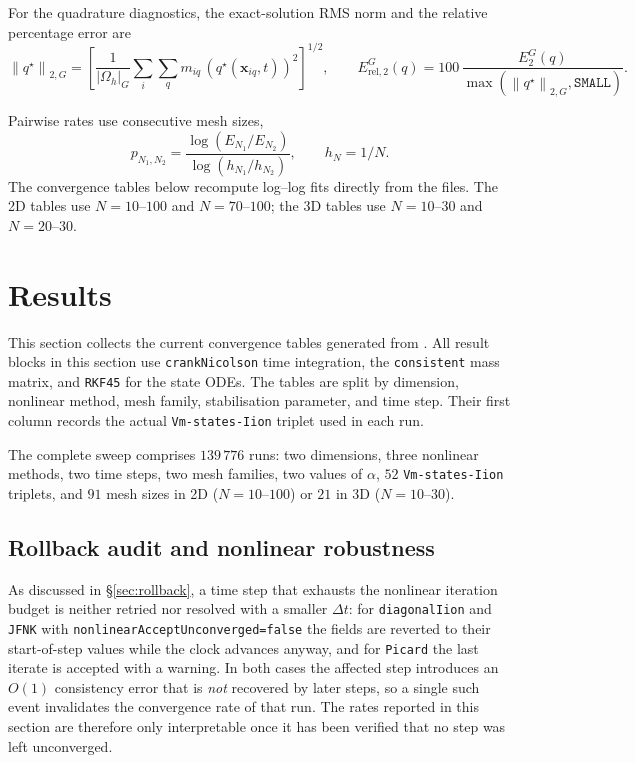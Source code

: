 \documentclass[11pt,a4paper]{article}
\newcommand{\code}[1]{\texttt{\small #1}}
\newcommand{\norm}[1]{\left\lVert #1 \right\rVert}
\begin{document}
For the quadrature diagnostics, the exact-solution RMS norm and the relative
percentage error are
\begin{equation}
  \norm{q^\star}_{2,G}
  =
  \left[
  \frac{1}{|\Omega_h|_G}
  \sum_i\sum_q m_{iq}\,
  \left(q^\star(\mathbf{x}_{iq},t)\right)^2
  \right]^{1/2},
  \qquad
  E_{\mathrm{rel},2}^{G}(q)
  =
  100\,\frac{E_2^G(q)}{\max(\norm{q^\star}_{2,G},\texttt{SMALL})}.
\end{equation}

Pairwise rates use consecutive mesh sizes,
\begin{equation}
p_{N_1,N_2} = \frac{\log(E_{N_1}/E_{N_2})}{\log(h_{N_1}/h_{N_2})}, \qquad h_N=1/N.
\end{equation}
The convergence tables below recompute log--log fits directly from the
 files. The 2D tables use $N=10$--$100$ and
$N=70$--$100$; the 3D tables use $N=10$--$30$ and $N=20$--$30$.


\section{Results}

This section collects the current convergence tables generated from
.
All result blocks in this section use \code{crankNicolson} time integration,
the \code{consistent} mass matrix, and \code{RKF45} for the state ODEs. The
tables are split by dimension, nonlinear method, mesh family, stabilisation
parameter, and time step. Their first column records the actual
\code{Vm-states-Iion} triplet used in each run.

The complete sweep comprises $139\,776$ runs: two dimensions, three nonlinear
methods, two time steps, two mesh families, two values of $\alpha$, $52$
\code{Vm-states-Iion} triplets, and $91$ mesh sizes in 2D ($N=10$--$100$) or
$21$ in 3D ($N=10$--$30$).

\subsection{Rollback audit and nonlinear robustness}
\label{sec:en-rollback-audit}

As discussed in \S\ref{sec:rollback}, a time step that exhausts the nonlinear
iteration budget is neither retried nor resolved with a smaller $\Delta t$: for
\code{diagonalIion} and \code{JFNK} with
\code{nonlinearAcceptUnconverged=false} the fields are reverted to their
start-of-step values while the clock advances anyway, and for \code{Picard} the
last iterate is accepted with a warning. In both cases the affected step
introduces an $O(1)$ consistency error that is \emph{not} recovered by later
steps, so a single such event invalidates the convergence rate of that run. The
rates reported in this section are therefore only interpretable once it has been
verified that no step was left unconverged.
\end{document}
